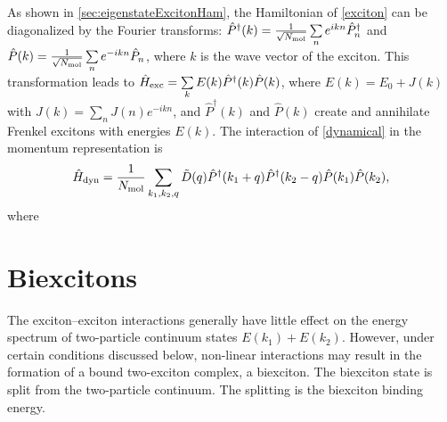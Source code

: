 As shown in \autoref{sec:eigenstateExcitonHam}, the Hamiltonian of  \autoref{exciton} can be diagonalized by the Fourier transforms: $\hat{P}^\dag(k) = \frac{1}{\sqrt{N_{\rm mol}}}
\sum\limits_n e^{ikn} \hat{P}_n^\dag$ and $\hat{P}(k) =
\frac{1}{\sqrt{N_{\rm mol}}} \sum\limits_n e^{-ikn} \hat{P}_n$,  where
$k$ is the wave vector of the exciton.  This transformation leads to 
 $\hat{H}_{\rm exc} = \sum\limits_k E(k)
\hat{P}^\dag(k) \hat{P}(k)$, where $E(k) = E_0 + J(k)$ with $J(k) =
\sum\limits_n J(n) e^{-ikn}$, and  $\hat{P}^\dag(k)$ and $\hat{P}(k)$ 
create and annihilate Frenkel excitons with energies $E(k)$.  The interaction of \autoref{dynamical}
in the momentum representation is
\begin{equation}\label{dynamical-k}
\hat{H}_{\rm dyn} = \frac{1}{N_{\rm mol}} \sum\limits_{k_1, k_2, q} \Tilde{D}(q)
\hat{P}^\dag(k_1+q) \hat{P}^\dag(k_2-q) \hat{P}(k_1) \hat{P}(k_2),
\end{equation}
where 



\section{Biexcitons}
\label{sec:biexciton}
The exciton--exciton interactions generally have little effect on the energy spectrum of two-particle
continuum states $E(k_1) + E(k_2)$. However, under certain conditions discussed below, non-linear
interactions may result in the formation of a bound two-exciton
complex, a biexciton. The biexciton state is split from the
two-particle continuum. The splitting is the biexciton binding energy. 

